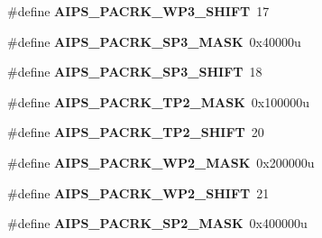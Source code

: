 \begin{DoxyCompactItemize}
\item 
\#define {\bfseries A\+I\+P\+S\+\_\+\+P\+A\+C\+R\+K\+\_\+\+W\+P3\+\_\+\+S\+H\+I\+FT}~17\hypertarget{group__AIPS__Register__Masks_ga3b38da2cc15c02970f7004f77602d903}{}\label{group__AIPS__Register__Masks_ga3b38da2cc15c02970f7004f77602d903}

\item 
\#define {\bfseries A\+I\+P\+S\+\_\+\+P\+A\+C\+R\+K\+\_\+\+S\+P3\+\_\+\+M\+A\+SK}~0x40000u\hypertarget{group__AIPS__Register__Masks_ga0c0b21d42bdf53643432cfc9e6185b61}{}\label{group__AIPS__Register__Masks_ga0c0b21d42bdf53643432cfc9e6185b61}

\item 
\#define {\bfseries A\+I\+P\+S\+\_\+\+P\+A\+C\+R\+K\+\_\+\+S\+P3\+\_\+\+S\+H\+I\+FT}~18\hypertarget{group__AIPS__Register__Masks_ga2ce4100fe4013f16c00777d2034d9b93}{}\label{group__AIPS__Register__Masks_ga2ce4100fe4013f16c00777d2034d9b93}

\item 
\#define {\bfseries A\+I\+P\+S\+\_\+\+P\+A\+C\+R\+K\+\_\+\+T\+P2\+\_\+\+M\+A\+SK}~0x100000u\hypertarget{group__AIPS__Register__Masks_gad4133f2128f9c9def47322e8f70707d2}{}\label{group__AIPS__Register__Masks_gad4133f2128f9c9def47322e8f70707d2}

\item 
\#define {\bfseries A\+I\+P\+S\+\_\+\+P\+A\+C\+R\+K\+\_\+\+T\+P2\+\_\+\+S\+H\+I\+FT}~20\hypertarget{group__AIPS__Register__Masks_ga689872c13b85beaa787d9988c754e4a0}{}\label{group__AIPS__Register__Masks_ga689872c13b85beaa787d9988c754e4a0}

\item 
\#define {\bfseries A\+I\+P\+S\+\_\+\+P\+A\+C\+R\+K\+\_\+\+W\+P2\+\_\+\+M\+A\+SK}~0x200000u\hypertarget{group__AIPS__Register__Masks_ga8d9748a860696928dec608b3ad5b8fc1}{}\label{group__AIPS__Register__Masks_ga8d9748a860696928dec608b3ad5b8fc1}

\item 
\#define {\bfseries A\+I\+P\+S\+\_\+\+P\+A\+C\+R\+K\+\_\+\+W\+P2\+\_\+\+S\+H\+I\+FT}~21\hypertarget{group__AIPS__Register__Masks_ga91382e195d86100bc0edd1f79f3d4685}{}\label{group__AIPS__Register__Masks_ga91382e195d86100bc0edd1f79f3d4685}

\item 
\#define {\bfseries A\+I\+P\+S\+\_\+\+P\+A\+C\+R\+K\+\_\+\+S\+P2\+\_\+\+M\+A\+SK}~0x400000u\hypertarget{group__AIPS__Register__Masks_gac8d3b5e60dc3c7d2d6131718ed5a63c8}{}\label{group__AIPS__Register__Masks_gac8d3b5e60dc3c7d2d6131718ed5a63c8}


\end{DoxyCompactItemize}
